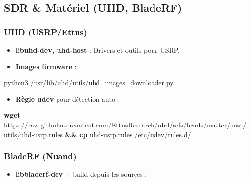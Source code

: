 \documentclass[
]{article}
\newenvironment{Shaded}{\begin{snugshade}}{\end{snugshade}}
\newcommand{\AttributeTok}[1]{\textcolor[rgb]{0.13,0.29,0.53}{#1}}
\newcommand{\BuiltInTok}[1]{#1}
\newcommand{\ExtensionTok}[1]{#1}
\newcommand{\FunctionTok}[1]{\textcolor[rgb]{0.13,0.29,0.53}{\textbf{#1}}}
\newcommand{\KeywordTok}[1]{\textcolor[rgb]{0.13,0.29,0.53}{\textbf{#1}}}
\newcommand{\NormalTok}[1]{#1}
\newcommand{\VariableTok}[1]{\textcolor[rgb]{0.00,0.00,0.00}{#1}}
\providecommand{\tightlist}{%
  \setlength{\itemsep}{0pt}\setlength{\parskip}{0pt}}
\begin{document}
\subsection{SDR \& Matériel (UHD,
BladeRF)}\label{sdr-matuxe9riel-uhd-bladerf}

\subsubsection{UHD (USRP/Ettus)}\label{uhd-usrpettus}

\begin{itemize}
\item
  \textbf{libuhd-dev, uhd-host} : Drivers et outils pour USRP.
\item
  \textbf{Images firmware} :
\end{itemize}

\begin{Shaded}
\begin{Highlighting}[]
\ExtensionTok{python3}\NormalTok{ /usr/lib/uhd/utils/uhd\_images\_downloader.py}
\end{Highlighting}
\end{Shaded}

\begin{itemize}
\tightlist
\item
  \textbf{Règle udev} pour détection auto :
\end{itemize}

\begin{Shaded}
\begin{Highlighting}[]
\FunctionTok{wget}\NormalTok{ https://raw.githubusercontent.com/EttusResearch/uhd/refs/heads/master/host/utils/uhd{-}usrp.rules }\KeywordTok{\&\&} \FunctionTok{cp}\NormalTok{ uhd{-}usrp.rules /etc/udev/rules.d/}
\end{Highlighting}
\end{Shaded}

\subsubsection{BladeRF (Nuand)}\label{bladerf-nuand}

\begin{itemize}
\tightlist
\item
  \textbf{libbladerf-dev} + build depuis les sources :
\end{itemize}

\begin{Shaded}
\end{Shaded}
\end{document}

